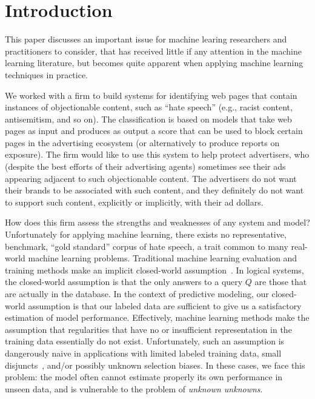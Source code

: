 \section{Introduction}
\label{sec:intro}

This paper discusses an important issue for machine learing researchers and practitioners to consider, that has received little if any attention in the machine learning literature, but becomes quite apparent when applying machine learning techniques in practice.

We worked with a firm to build systems for identifying web pages that contain instances of objectionable content, such as ``hate speech'' (e.g., racist content, antisemitism, and so on). The classification is based on models that take web pages as input and produces as output a score that can be used to block certain pages in the advertising ecosystem (or alternatively to produce reports on exposure).  The firm would like to use this system to help protect advertisers, who (despite the best efforts of their advertising agents) sometimes see their ads appearing adjacent to such objectionable content.  The advertisers do not want their brands to be associated with such content, and they definitely do not want to support such content, explicitly or implicitly, with their ad dollars. 



How does this firm assess the strengths and weaknesses of any system
and model?  Unfortunately for applying machine learning, there exists 
no representative, benchmark, ``gold standard'' corpus of hate speech, 
a trait common to many real-world machine learning problems.
Traditional machine learning evaluation and training
methods make an implicit closed-world
assumption~\cite{Reiter77closedworld}. In logical systems, the
closed-world assumption is that the only answers to a query $Q$ are those
that are actually in the database. In the context of predictive
modeling, our closed-world assumption is that our labeled 
data are sufficient to give us a satisfactory estimation of
model performance. Effectively, machine learning methods 
make the assumption that regularities that have no or insufficient
representation in the training data essentially do not exist. 
Unfortunately, such an assumption is dangerously naive 
in applications with limited labeled training
data, small disjuncts~\cite{weiss10disjunct}, and/or possibly unknown
selection biases. In these cases, we face this problem: 
the model often cannot estimate properly
its own performance in unseen data, and is vulnerable to the problem
of \emph{unknown unknowns}.

